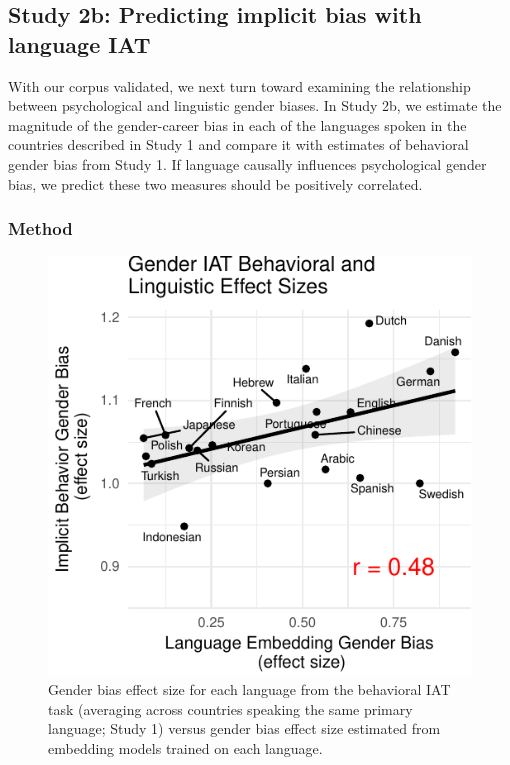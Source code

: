 \documentclass[10pt, letterpaper]{article}
\newenvironment{CodeChunk}{}{}
\begin{document}
\subsection{Study 2b: Predicting implicit bias with language
IAT}\label{study-2b-predicting-implicit-bias-with-language-iat}

With our corpus validated, we next turn toward examining the
relationship between psychological and linguistic gender biases. In
Study 2b, we estimate the magnitude of the gender-career bias in each of
the languages spoken in the countries described in Study 1 and compare
it with estimates of behavioral gender bias from Study 1. If language
causally influences psychological gender bias, we predict these two
measures should be positively correlated.

\subsubsection{Method}\label{method-2}

\begin{CodeChunk}
\begin{figure}[t]

{\centering \includegraphics{figs/behavior_vs_language_plot-1} 

}

\caption[Gender bias effect size for each language from the behavioral IAT task (averaging across countries speaking the same primary language]{Gender bias effect size for each language from the behavioral IAT task (averaging across countries speaking the same primary language; Study 1) versus gender bias effect size estimated from embedding models trained on each language.}\label{fig:behavior_vs_language_plot}
\end{figure}
\end{CodeChunk}
\end{document}

